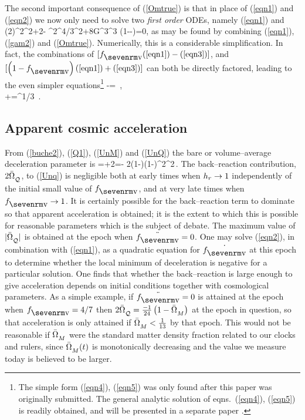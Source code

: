 \documentclass[12pt]{article}
\begin{document}
The second important consequence of (\ref{Omtrue}) is that in place of
(\ref{eqn1}) and (\ref{eqn2}) we now only need to solve two {\em first
order} ODEs, namely (\ref{eqn1}) and
\beq
(2){\dot\ab^2\over\ab^2}+{2}\dot\fv{\dot\ab\over\ab}-
{\al^2\fv^{4/3}\over\ab^2}+{8\pi G}{\rhb{}}{\ab{}^3\over\ab^3}
\left(1-\epi-\fv\right)=0,
\label{eqn3}\eeq
as may be found by combining (\ref{eqn1}), (\ref{gam2}) and (\ref{Omtrue}).
Numerically, this is a considerable simplification.
In fact, the combinations of $[\fv\hbox{(\ref{eqn1})}
-\hbox{(\ref{eqn3})}]$, and $[\fvf\hbox{(\ref{eqn1})}+\hbox{(\ref{eqn3})}]$
can both be directly factored, leading to the even simpler
equations\footnote{The simple form (\ref{eqn4}), (\ref{eqn5})
was only found after this paper was originally submitted. The general
analytic solution of eqns.\ (\ref{eqn4}), (\ref{eqn5}) is readily obtained,
and will be presented in a separate paper \cite{sol}.}
\bea
\fvf{\dot\ab\over\ab}-\dot\fv=
\,,
\label{eqn4}\\
{\dot\ab\over\ab}+{\dot\fv{}\fv}={\al\over\fv^{1/3}\ab}
\,.
\label{eqn5}
\eea

\subsection{Apparent cosmic acceleration\label{acc}}

{}From (\ref{buche2}), (\ref{Q1}), (\ref{UnM}) and (\ref{UnQ}) the bare
or volume--average deceleration parameter is
\beq
\bq\equiv{-\ddot\ab\over\bH^2\ab}=\half\OMM+2\OMQ=\half\OMM-
{2\fv(1-\fv)(1-\hr)^2\over\left[\hr+(1-\hr)\fv\right]^2}\,.
\label{Unq}\eeq
The back--reaction contribution, $2\OMQ$, to (\ref{Unq}) is negligible both
at early times when $h_r\to1$ independently of the initial small value of
$\fv$, and at very late times when $\fv\to1$. It is certainly possible for
the back--reaction term to dominate so that apparent acceleration is
obtained; it is the extent to which this is possible for reasonable
parameters which is the subject of debate. The maximum value of $|\OMQ|$
is obtained at the epoch when $\ddot\fv=0$. One may solve (\ref{eqn2}), in
combination with (\ref{eqn1}), as a quadratic equation for $\dot\fv$ at this
epoch to determine whether the local minimum of deceleration is negative for a
particular solution. One finds that whether the back--reaction is large
enough to give acceleration depends on initial conditions together with
cosmological parameters. As a simple example, if $\ddot\fv=0$ is attained
at the epoch when $\fv=4/7$ then $2\OMQ=\frac{-1}{24}\left(1-\OMM
\right)$ at the epoch in question, so that acceleration is only attained if
$\OMM<\frac1{13}$ by that epoch. This would not be reasonable if $\OMM$ were
the standard matter density fraction related to our clocks and rulers,
since $\OMM(t)$ is monotonically decreasing and the value we measure today is
believed to be larger.
\end{document}
